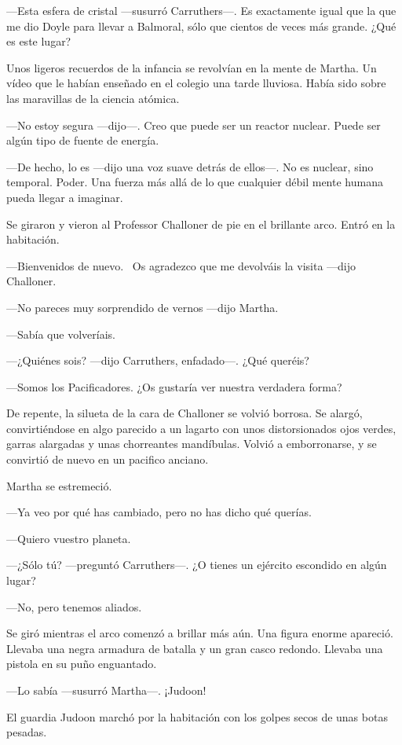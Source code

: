 ---Esta esfera de cristal ---susurró Carruthers---. Es exactamente igual
que la que me dio Doyle para llevar a Balmoral, sólo que cientos de
veces más grande. ¿Qué es este lugar?

Unos ligeros recuerdos de la infancia se revolvían en la mente de
Martha. Un vídeo que le habían enseñado en el colegio una tarde
lluviosa. Había sido sobre las maravillas de la ciencia atómica.

---No estoy segura ---dijo---. Creo que puede ser un reactor nuclear.
Puede ser algún tipo de fuente de energía.

---De hecho, lo es ---dijo una voz suave detrás de ellos---. No es
nuclear, sino temporal. Poder. Una fuerza más allá de lo que cualquier
débil mente humana pueda llegar a imaginar.

Se giraron y vieron al Professor Challoner de pie en el brillante arco.
Entró en la habitación.

---Bienvenidos de nuevo. ~Os agradezco que me devolváis la visita
---dijo Challoner.

---No pareces muy sorprendido de vernos ---dijo Martha.

---Sabía que volveríais.

---¿Quiénes sois? ---dijo Carruthers, enfadado---. ¿Qué queréis?

---Somos los Pacificadores. ¿Os gustaría ver nuestra verdadera forma?

De repente, la silueta de la cara de Challoner se volvió borrosa. Se
alargó, convirtiéndose en algo parecido a un lagarto con unos
distorsionados ojos verdes, garras alargadas y unas chorreantes
mandíbulas. Volvió a emborronarse, y se convirtió de nuevo en un
pacifico anciano.

Martha se estremeció.

---Ya veo por qué has cambiado, pero no has dicho qué querías.

---Quiero vuestro planeta.

---¿Sólo tú? ---preguntó Carruthers---. ¿O tienes un ejército escondido
en algún lugar?

---No, pero tenemos aliados.

Se giró mientras el arco comenzó a brillar más aún. Una figura enorme
apareció. Llevaba una negra armadura de batalla y un gran casco redondo.
Llevaba una pistola en su puño enguantado.

---Lo sabía ---susurró Martha---. ¡Judoon!

El guardia Judoon marchó por la habitación con los golpes secos de unas
botas pesadas.

